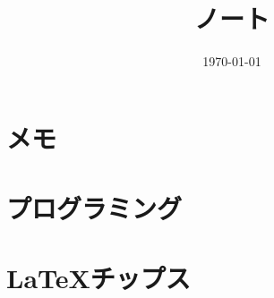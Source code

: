 \documentclass[6pt]{jreport}
\title{ノート}
\author{}
\date{\today}
\begin{document}
\maketitle
\tableofcontents

\chapter{メモ}


\chapter{プログラミング}
%
%
\chapter{\LaTeX チップス}
%



\end{document}
